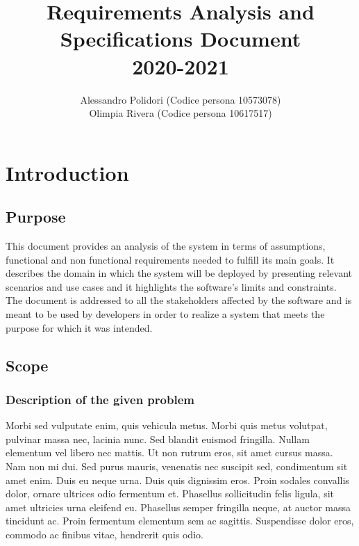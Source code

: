 \documentclass{article}
\title{ Requirements Analysis and Specifications Document\\2020-2021}
\author{Alessandro Polidori (Codice persona 10573078)\\Olimpia Rivera (Codice persona 10617517)}
\date{}
\begin{document}
\maketitle
\tableofcontents{}

\newpage

\section{Introduction}

\subsection{Purpose}
This document provides an analysis of the system in terms of assumptions, functional and non functional requirements needed to fulfill its main goals. It describes the domain in which the system will be deployed by presenting relevant scenarios and use cases and it highlights the software’s limits and constraints.
\bigskip \\
The document is addressed to all the stakeholders affected by the software and is meant to be used by developers in order to realize a system that meets the purpose for which it was intended.\\

\subsection{Scope}
\subsubsection{Description of the given problem}
Morbi sed vulputate enim, quis vehicula metus. Morbi quis metus volutpat, pulvinar massa nec, lacinia nunc. Sed blandit euismod fringilla. Nullam elementum vel libero nec mattis. Ut non rutrum eros, sit amet cursus massa. Nam non mi dui. Sed purus mauris, venenatis nec suscipit sed, condimentum sit amet enim. Duis eu neque urna. Duis quis dignissim eros. Proin sodales convallis dolor, ornare ultrices odio fermentum et. Phasellus sollicitudin felis ligula, sit amet ultricies urna eleifend eu. Phasellus semper fringilla neque, at auctor massa tincidunt ac. Proin fermentum elementum sem ac sagittis. Suspendisse dolor eros, commodo ac finibus vitae, hendrerit quis odio.\\
\end{document}
